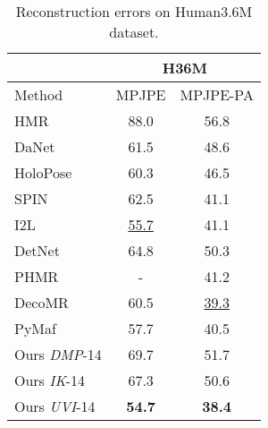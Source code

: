\documentclass[10pt,twocolumn,letterpaper]{article}
\begin{document}
\begin{table}
\begin{center}
\small
\begin{tabular}{l |c|c }
\hline
        &    \multicolumn{2}{c}{H36M} \\
\hline
Method  &  MPJPE & MPJPE-PA \\
\hline
HMR \cite{HMR}    & 88.0   & 56.8  \\
DaNet \cite{pamigcndensepose} & 61.5   & 48.6  \\
HoloPose \cite{holopose}  & 60.3   & 46.5  \\
SPIN \cite{spin}    & 62.5   & 41.1  \\
I2L \cite{I2L}     &  \underline{55.7}  &  41.1 \\
DetNet \cite{zhou2021monocular}  & 64.8 & 50.3 \\
PHMR \cite{HybrIK}     &  -  &  41.2 \\
DecoMR \cite{decomr}      &  60.5  &  \underline{39.3} \\
PyMaf \cite{pymaf}      &  57.7  &  40.5 \\
\hline
Ours \textit{DMP}-14    & 69.7 & 51.7  \\
Ours \textit{IK}-14       &67.3 & 50.6\\
Ours \textit{UVI}-14       & \textbf{54.7}  & \textbf{38.4} \\
\hline
\end{tabular}
\end{center}
\caption{Reconstruction errors on Human3.6M dataset.}
\label{table:h36m}
\end{table}
\end{document}
